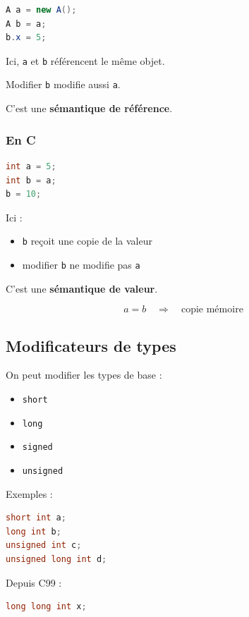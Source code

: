 \begin{lstlisting}[language=Java]
A a = new A();
A b = a;
b.x = 5;
\end{lstlisting}

Ici, \texttt{a} et \texttt{b} référencent le même objet.

Modifier \texttt{b} modifie aussi \texttt{a}.

C’est une \textbf{sémantique de référence}.

\subsubsection{En C}

\begin{lstlisting}[language=C]
int a = 5;
int b = a;
b = 10;
\end{lstlisting}

Ici :

\begin{itemize}
    \item \texttt{b} reçoit une copie de la valeur
    \item modifier \texttt{b} ne modifie pas \texttt{a}
\end{itemize}

C’est une \textbf{sémantique de valeur}.

\[
a = b \quad \Rightarrow \quad \text{copie mémoire}
\]

\subsection{Modificateurs de types}

On peut modifier les types de base :

\begin{itemize}
    \item \texttt{short}
    \item \texttt{long}
    \item \texttt{signed}
    \item \texttt{unsigned}
\end{itemize}

Exemples :

\begin{lstlisting}[language=C]
short int a;
long int b;
unsigned int c;
unsigned long int d;
\end{lstlisting}

Depuis C99 :

\begin{lstlisting}[language=C]
long long int x;
\end{lstlisting}

